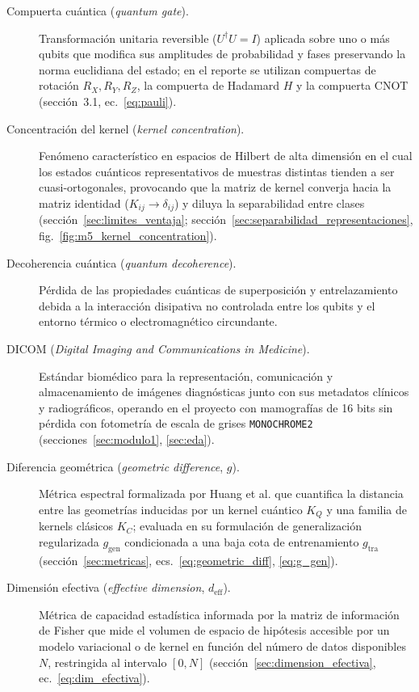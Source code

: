 \begin{description}
  \item[Compuerta cuántica (\textit{quantum gate}).] Transformación unitaria reversible ($U^\dagger U = I$) aplicada sobre uno o más qubits que modifica sus amplitudes de probabilidad y fases preservando la norma euclidiana del estado; en el reporte se utilizan compuertas de rotación $R_X, R_Y, R_Z$, la compuerta de Hadamard $H$ y la compuerta CNOT (sección~3.1, ec.~\ref{eq:pauli}).

  \item[Concentración del kernel (\textit{kernel concentration}).] Fenómeno característico en espacios de Hilbert de alta dimensión en el cual los estados cuánticos representativos de muestras distintas tienden a ser cuasi-ortogonales, provocando que la matriz de kernel converja hacia la matriz identidad ($K_{ij} \to \delta_{ij}$) y diluya la separabilidad entre clases (sección~\ref{sec:limites_ventaja}; sección~\ref{sec:separabilidad_representaciones}, fig.~\ref{fig:m5_kernel_concentration}).

  \item[Decoherencia cuántica (\textit{quantum decoherence}).] Pérdida de las propiedades cuánticas de superposición y entrelazamiento debida a la interacción disipativa no controlada entre los qubits y el entorno térmico o electromagnético circundante.

  \item[DICOM (\textit{Digital Imaging and Communications in Medicine}).] Estándar biomédico para la representación, comunicación y almacenamiento de imágenes diagnósticas junto con sus metadatos clínicos y radiográficos, operando en el proyecto con mamografías de 16 bits sin pérdida con fotometría de escala de grises \texttt{MONOCHROME2} (secciones~\ref{sec:modulo1}, \ref{sec:eda}).

  \item[Diferencia geométrica (\textit{geometric difference}, $g$).] Métrica espectral formalizada por Huang et al. que cuantifica la distancia entre las geometrías inducidas por un kernel cuántico $K_Q$ y una familia de kernels clásicos $K_C$; evaluada en su formulación de generalización regularizada $g_{\mathrm{gen}}$ condicionada a una baja cota de entrenamiento $g_{\mathrm{tra}}$ (sección~\ref{sec:metricas}, ecs.~\ref{eq:geometric_diff}, \ref{eq:g_gen}).

  \item[Dimensión efectiva (\textit{effective dimension}, $d_{\mathrm{eff}}$).] Métrica de capacidad estadística informada por la matriz de información de Fisher que mide el volumen de espacio de hipótesis accesible por un modelo variacional o de kernel en función del número de datos disponibles $N$, restringida al intervalo $[0, N]$ (sección~\ref{sec:dimension_efectiva}, ec.~\ref{eq:dim_efectiva}).


\end{description}
